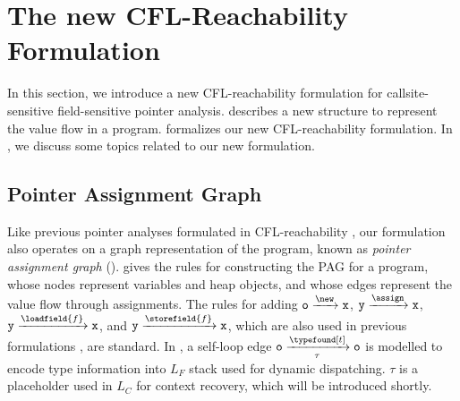 \section{The new CFL-Reachability Formulation}
\label{sec:CFL}

In this section, we introduce a new CFL-reachability formulation for callsite-sensitive field-sensitive pointer analysis.  describes a new \pag structure to represent the value flow in a program.
 formalizes our new CFL-reachability formulation. In , we discuss 
some topics related to our new formulation. 


\subsection{Pointer Assignment Graph} 
\label{subsec:newPAG}

Like previous pointer analyses formulated in CFL-reachability \cite{sridharan2005demand, sridharan2006refinement, lu2019precision, lu2021eagle}, our formulation also operates on a
graph representation of the program, known as \textit{pointer assignment graph} (\pag). 
 gives the rules for constructing the PAG for a program, whose nodes 
represent variables and heap objects, and whose edges represent the value flow through 
assignments. The rules for adding $\mathtt{o} \xrightarrow{\new} \mathtt{x}$, $\mathtt{y} 
\xrightarrow{\assign} \mathtt{x}$, $\mathtt{y} \xrightarrow{\loadfield{f}} \mathtt{x}$, and 
$\mathtt{y} \xrightarrow{\storefield{f}} \mathtt{x}$, which are also used in previous 
formulations \cite{sridharan2005demand, sridharan2006refinement, lu2019precision, lu2021eagle}, 
are standard. In , a self-loop edge $\mathtt{o} \xrightarrow[\tau]{\typefound[t]} \mathtt{o}$ is modelled to encode type information into $L_F$ stack used for dynamic dispatching. $\tau$ is a placeholder used in $L_C$ for context recovery, which will be introduced shortly.  


